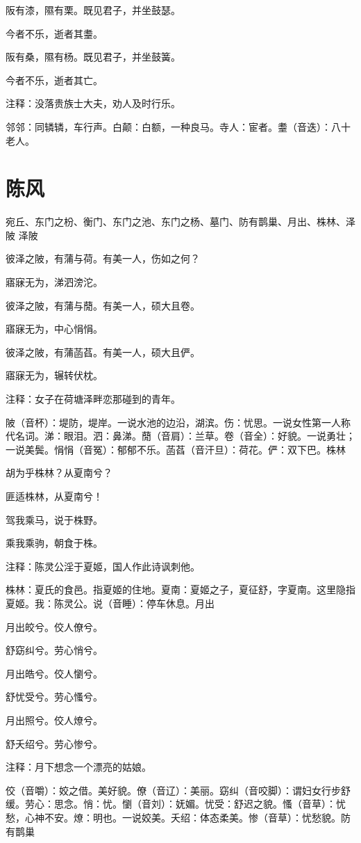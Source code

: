 \documentclass[12pt,UTF8]{ctexbook}
\begin{document}
阪有漆，隰有栗。既见君子，并坐鼓瑟。

今者不乐，逝者其耋。

阪有桑，隰有杨。既见君子，并坐鼓簧。

今者不乐，逝者其亡。

注释：没落贵族士大夫，劝人及时行乐。

邻邻：同辚辚，车行声。白颠：白额，一种良马。寺人：宦者。耋（音迭）：八十老人。



\part{陈风}
宛丘、东门之枌、衡门、东门之池、东门之杨、墓门、防有鹊巢、月出、株林、泽陂
泽陂

彼泽之陂，有蒲与荷。有美一人，伤如之何？

寤寐无为，涕泗滂沱。

彼泽之陂，有蒲与蕑。有美一人，硕大且卷。

寤寐无为，中心悁悁。

彼泽之陂，有蒲菡萏。有美一人，硕大且俨。

寤寐无为，辗转伏枕。

注释：女子在荷塘泽畔恋那碰到的青年。

陂（音杯）：堤防，堤岸。一说水池的边沿，湖滨。伤：忧思。一说女性第一人称代名词。涕：眼泪。泗：鼻涕。蕑（音肩）：兰草。卷（音全）：好貌。一说勇壮；一说美鬓。悁悁（音冤）：郁郁不乐。菡萏（音汗旦）：荷花。俨：双下巴。株林

胡为乎株林？从夏南兮？

匪适株林，从夏南兮！

驾我乘马，说于株野。

乘我乘驹，朝食于株。

注释：陈灵公淫于夏姬，国人作此诗讽刺他。

株林：夏氏的食邑。指夏姬的住地。夏南：夏姬之子，夏征舒，字夏南。这里隐指夏姬。我：陈灵公。说（音睡）：停车休息。月出

月出皎兮。佼人僚兮。

舒窈纠兮。劳心悄兮。

月出皓兮。佼人懰兮。

舒忧受兮。劳心慅兮。

月出照兮。佼人燎兮。

舒夭绍兮。劳心惨兮。

注释：月下想念一个漂亮的姑娘。

佼（音嚼）：姣之借。美好貌。僚（音辽）：美丽。窈纠（音咬脚）：谓妇女行步舒缓。劳心：思念。悄：忧。懰（音刘）：妩媚。忧受：舒迟之貌。慅（音草）：忧愁，心神不安。燎：明也。一说姣美。夭绍：体态柔美。惨（音草）：忧愁貌。防有鹊巢
\end{document}
